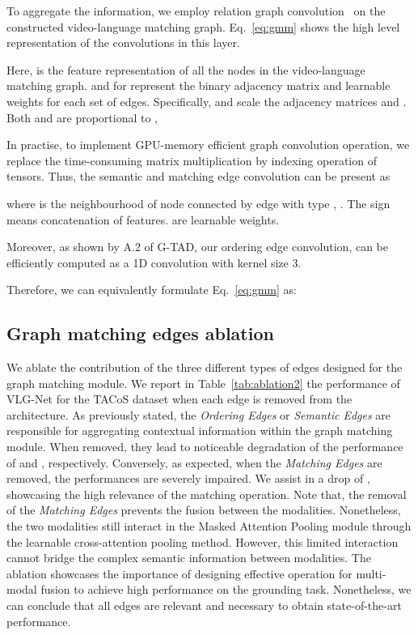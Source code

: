 \documentclass[10pt,twocolumn,letterpaper]{article}
\begin{document}
To aggregate the information, we employ relation graph convolution~\cite{schlichtkrull2017modeling} on the constructed video-language matching graph. Eq.~\ref{eq:gmm} shows the high level representation of the convolutions in this layer.

Here,  is the feature representation of all the nodes in the video-language matching graph. 
 and  for  represent the binary adjacency matrix and learnable weights for each set of edges. 
Specifically,  and  scale the adjacency matrices  and . Both  and  are proportional to ,


In practise, to implement GPU-memory efficient graph convolution operation, we replace the time-consuming matrix multiplication by indexing operation of tensors. 
Thus, the semantic and matching edge convolution can be present as 

where  is the neighbourhood of node  connected by edge with type , . The  sign means concatenation of features.  are learnable weights.

Moreover, as shown by A.2 of G-TAD\cite{Xu_2020_CVPR}, our ordering edge convolution, can be efficiently computed as a 1D convolution with kernel size 3.

Therefore, we can equivalently formulate Eq.~\ref{eq:gmm} as:



\subsection*{Graph matching edges ablation}
We ablate the contribution of the three different types of edges designed for the graph matching module. 
We report in Table~\ref{tab:ablation2}  the performance of VLG-Net for the TACoS dataset when each edge is removed from the architecture.
As previously stated, the \textit{Ordering Edges} or \textit{Semantic Edges} are responsible for aggregating contextual information within the graph matching module. When removed, they lead to noticeable degradation of the performance of  and , respectively.
Conversely, as expected, when the \textit{Matching Edges} are removed, the performances are severely impaired. We assist in a drop of , showcasing the high relevance of the matching operation. 
Note that, the removal of the \textit{Matching Edges} prevents the fusion between the modalities. Nonetheless, the two modalities still interact in the Masked Attention Pooling module through the learnable cross-attention pooling method. However, this limited interaction cannot bridge the complex semantic information between modalities. 
The ablation showcases the importance of designing effective operation for multi-modal fusion to achieve high performance on the grounding task. 
Nonetheless, we can conclude that all edges are relevant and necessary to obtain state-of-the-art performance.
\end{document}
